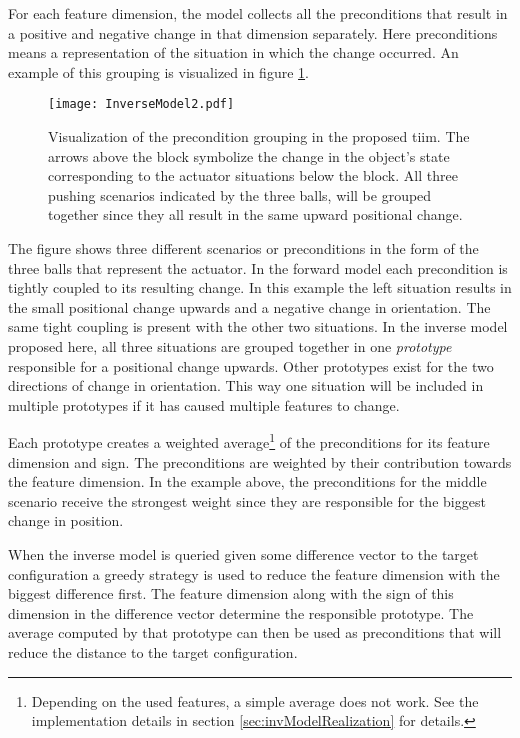For each feature dimension, the model collects all the preconditions that result in a positive and negative change in that dimension separately. Here preconditions means a representation of the situation in which the change occurred.  
An example of this grouping is visualized in figure \ref{fig:InverseModel}. 

\begin{figure}
	\centering
	\texttt{[image: InverseModel2.pdf]}
	\caption{Visualization of the precondition grouping in the proposed \acrlong{tiim}. The arrows above the block symbolize the change in the object's state corresponding to the actuator situations below the block. All three pushing scenarios indicated by the three balls, will be grouped together since they all result in the same upward positional change.}
	\label{fig:InverseModel}
\end{figure}

The figure shows three different scenarios or preconditions in the form of the three balls that represent the actuator. In the forward model each precondition is tightly coupled to its resulting change. In this example the left situation results in the small positional change upwards and a negative change in orientation. The same tight coupling is present with the other two situations. In the inverse model proposed here, all three situations are grouped together in one \textit{prototype} responsible for a positional change upwards. Other prototypes exist for the two directions of change in orientation. This way one situation will be included in multiple prototypes if it has caused multiple features to change.

Each prototype creates a weighted average\footnote{Depending on the used features, a simple average does not work. See the implementation details in section \ref{sec:invModelRealization} for details.} of the preconditions for its feature dimension and sign. The preconditions are weighted by their contribution towards the feature dimension. In the example above, the preconditions for the middle scenario receive the strongest weight since they are responsible for the biggest change in position. 

When the inverse model is queried given some difference vector to the target configuration a greedy strategy is used to reduce the feature dimension with the biggest difference first. 
The feature dimension along with the sign of this dimension in the difference vector determine the responsible prototype. The average computed by that prototype can then be used as preconditions that will reduce the distance to the target configuration.



	
